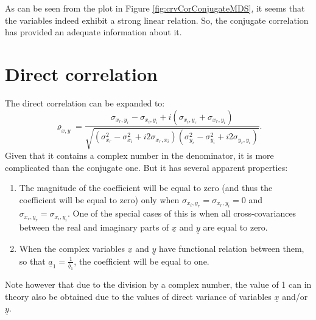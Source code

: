 \documentclass[
]{book}
\begin{document}
As can be seen from the plot in Figure \ref{fig:crvCorConjugateMDS}, it seems that the variables indeed exhibit a strong linear relation. So, the conjugate correlation has provided an adequate information about it.

\hypertarget{correlationDirect}{%
\section{Direct correlation}\label{correlationDirect}}

The direct correlation can be expanded to:
\begin{equation}
    {\varrho}_{x,y} = \frac{\sigma_{x_r, y_r} - \sigma_{x_i, y_i} + i (\sigma_{x_i, y_r} + \sigma_{x_r, y_i})}{\sqrt{(\sigma_{x_r}^2 - \sigma_{x_i}^2 + i2 \sigma_{x_r,x_i})(\sigma_{y_r}^2 - \sigma_{y_i}^2 + i2 \sigma_{y_r,y_i})}}.
    \label{eq:correlationPseudoExpanded}
\end{equation}
Given that it contains a complex number in the denominator, it is more complicated than the conjugate one. But it has several apparent properties:

\begin{enumerate}
\def\labelenumi{\arabic{enumi}.}
\item
  The magnitude of the coefficient will be equal to zero (and thus the coefficient will be equal to zero) only when \(\sigma_{x_i,y_r}=\sigma_{x_r,y_i}=0\) and \(\sigma_{x_r,y_r}=\sigma_{x_i,y_i}\). One of the special cases of this is when all cross-covariances between the real and imaginary parts of \(\underline{x}\) and \(\underline{y}\) are equal to zero.
\item
  When the complex variables \(\underline{x}\) and \(\underline{y}\) have functional relation between them, so that \(\underline{a}_1 = \frac{1}{\underline{b}_1}\), the coefficient will be equal to one.
\end{enumerate}

Note however that due to the division by a complex number, the value of 1 can in theory also be obtained due to the values of direct variance of variables \(\underline{x}\) and/or \(\underline{y}\).
\end{document}
